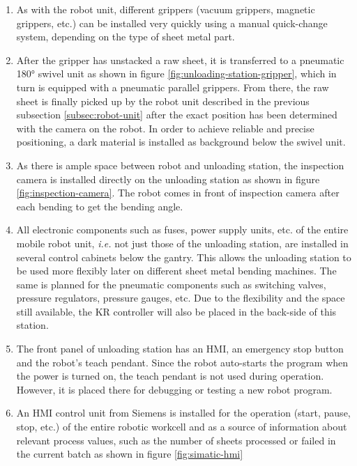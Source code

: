 \begin{enumerate}
    \item As with the robot unit, different grippers (vacuum grippers, magnetic grippers, etc.) can be
    installed very quickly using a manual quick-change system, depending on the type of sheet metal part.
    \item After the gripper has unstacked a raw sheet, it is transferred to a pneumatic 180° swivel unit as shown in figure \ref{fig:unloading-station-gripper}, which in
    turn is equipped with a pneumatic parallel grippers. From
    there, the raw sheet is finally picked up by the robot unit described in the previous subsection \ref{subsec:robot-unit} after the
    exact position has been determined with the camera on the robot. In order to achieve reliable and
    precise positioning, a dark material is installed as background below the swivel unit. 
    \item As there is ample space between robot and unloading station, the inspection camera is installed directly on the unloading station as shown in figure \ref{fig:inspection-camera}.
    The robot comes in front of inspection camera after each bending to get the bending angle.
    \item All electronic
    components such as fuses, power supply units, etc. of the entire mobile robot unit, \textit{i.e.} not just those of
    the unloading station, are installed in several control cabinets below the gantry. This allows the
    unloading station to be used more flexibly later on different sheet metal bending machines. The same is
    planned for the pneumatic components such as switching valves, pressure regulators, pressure
    gauges, etc. Due to the flexibility and the space still available, the KR controller will also be
    placed in the back-side of this station.
    \item The front panel of unloading station has an HMI, an emergency stop button and the robot's teach pendant. Since the robot auto-starts the program
    when the power is turned on, the teach pendant is not used during operation. However, it is placed there for debugging or testing a new robot program.
    \item An HMI control unit from Siemens is installed for the operation (start, pause, stop, etc.) of the entire robotic workcell and as
    a source of information about relevant process values, such as the number of sheets processed or failed in the current batch as shown in figure \ref{fig:simatic-hmi} 
    

\end{enumerate}
